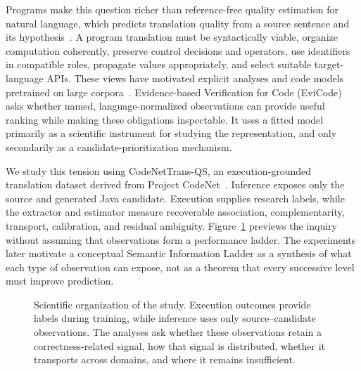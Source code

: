 \documentclass[conference]{IEEEtran}
\begin{document}
Programs make this question richer than reference-free quality estimation for natural language, which predicts translation quality from a source sentence and its hypothesis~\cite{fonseca2019wmtqe,kepler2019openkiwi,ranasinghe2020transquest,rei2022cometkiwi}. A program translation must be syntactically viable, organize computation coherently, preserve control decisions and operators, use identifiers in compatible roles, propagate values appropriately, and select suitable target-language APIs. These views have motivated explicit analyses and code models pretrained on large corpora~\cite{allamanis2018survey,mou2016tbcnn,alon2019code2vec,feng2020codebert,guo2021graphcodebert,wang2021codet5,guo2022unixcoder}. Evidence-based Verification for Code (EviCode) asks whether named, language-normalized observations can provide useful ranking while making these obligations inspectable. It uses a fitted model primarily as a scientific instrument for studying the representation, and only secondarily as a candidate-prioritization mechanism.

We study this tension using CodeNetTrans-QS, an execution-grounded translation dataset derived from Project CodeNet~\cite{naik2026codenettransqs,puri2021codenet}. Inference exposes only the source and generated Java candidate. Execution supplies research labels, while the extractor and estimator measure recoverable association, complementarity, transport, calibration, and residual ambiguity. Figure~\ref{fig:investigation} previews the inquiry without assuming that observations form a performance ladder. The experiments later motivate a conceptual Semantic Information Ladder as a synthesis of what each type of observation can expose, not as a theorem that every successive level must improve prediction.

\begin{figure}[t]
\centering
{}
\caption{Scientific organization of the study. Execution outcomes provide labels during training, while inference uses only source--candidate observations. The analyses ask whether these observations retain a correctness-related signal, how that signal is distributed, whether it transports across domains, and where it remains insufficient.}
\label{fig:investigation}
\end{figure}
\end{document}
